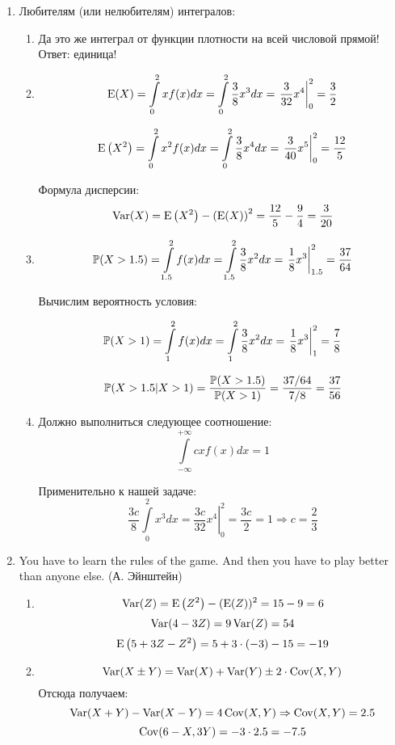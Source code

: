 \begin{enumerate}
\item
Любителям (или нелюбителям) интегралов:
\begin{enumerate}
\item Да это же интеграл от функции плотности на всей числовой прямой! Ответ: единица!
\item \[
\E(X) = \int \limits_0^2 x f(x) dx = \int \limits_0^2 \frac{3}{8} x^3 dx =
\left. \frac{3}{32} x^4 \right|_0^2 = \frac{3}{2}
\]

\[
\E\left(X^2\right) = \int \limits_0^2 x^2 f(x) dx = \int \limits_0^2 \frac{3}{8} x^4 dx
= \left. \frac{3}{40} x^5 \right|_0^2 = \frac{12}{5}
\]

Формула дисперсии:
\[
\Var(X) = \E\left(X^2\right) - \left(\E(X) \right)^2 = \frac{12}{5} - \frac{9}{4} = \frac{3}{20}
\]

\item \[
\P(X>1.5) = \int \limits_{1.5}^2 f(x) dx = \int \limits_{1.5}^2 \frac{3}{8} x^2 dx =
\left.\frac{1}{8} x^3 \right|_{1.5}^2 = \frac{37}{64}
\]

Вычислим вероятность условия:

\[
\P(X>1) = \int \limits_1^2 f(x) dx = \int \limits_1^2 \frac{3}{8} x^2 dx
= \left. \frac{1}{8} x^3 \right|_1^2 = \frac{7}{8}
\]

\[
\P(X>1.5 | X>1) = \frac{\P(X>1.5)}{\P( X>1)} = \frac{37/64}{7/8} = \frac{37}{56}
\]

\item Должно выполниться следующее соотношение:
\[
\int \limits_{-\infty}^{+\infty} c x f(x) dx  = 1
\]

Применительно к нашей задаче:
\[
\frac{3c}{8} \int \limits_0^2 x^3 dx  = \left.\frac{3c}{32} x^4 \right|_0^2 = \frac{3c}{2} =
1 \Rightarrow c = \frac{2}{3}
\]
\end{enumerate}

\item
You have to learn the rules of the game. And then you have to play better than
anyone else. (А. Эйнштейн)

\begin{enumerate}
\item \[
\Var(Z) = \E\left(Z^2\right) - (\E(Z))^2 = 15 - 9 = 6
\]
\[
\Var(4 - 3Z) = 9\Var(Z) = 54
\]
\[
\E\left(5 + 3Z - Z^2\right) = 5 + 3\cdot (-3)  - 15 = -19
\]

\item
\[
\Var(X \pm Y) = \Var(X) + \Var(Y) \pm 2 \cdot \Cov(X, Y)
\]
Отсюда получаем:
\[
\Var(X + Y) - \Var(X - Y) = 4 \Cov(X, Y) \Rightarrow \Cov(X, Y) = 2.5
\]
\[
\Cov(6 - X, 3Y) = -3\cdot 2.5 = -7.5
\]


\end{enumerate}
\end{enumerate}

